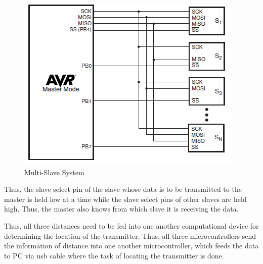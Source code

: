 \begin{figure}[htpb]
	\centering
	\includegraphics[scale=1]{Images/Multislave.png}
	\caption{Multi-Slave System}
	\label{fig:Multislave}
\end{figure}
Thus, the slave select pin of the slave whose data is to be transmitted to the master is held low at a time while the slave select pins of other slaves are held high. Thus, the master also knows from which slave it is receiving the data.

Thus, all three distances need to be fed into one another computational device for determining the location of the transmitter. Thus, all three microcontrollers send the information of distance into one another microcontroller, which feeds the data to PC via \gls{usb} cable where the task of locating the transmitter is done.

